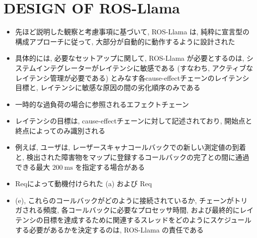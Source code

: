 
\section{DESIGN OF ROS-Llama}
\label{sec: design of ros-llama}

\begin{frame}{}
    \begin{itemize}
        \item 先ほど説明した観察と考慮事項に基づいて, ROS-Llama は, 純粋に宣言型の構成アプローチに従って, 大部分が自動的に動作するように設計された
        \item 具体的には, 必要なセットアップに関して, ROS-Llama が必要とするのは, システムインテグレーターがレイテンシに敏感である (すなわち, アクティブなレイテンシ管理が必要である) とみなす各cause-effectチェーンのレイテンシ目標と, レイテンシに敏感な原因の間の劣化順序のみである
        \item 一時的な過負荷の場合に参照されるエフェクトチェーン
    \end{itemize}
\end{frame}

\begin{frame}{}
    \begin{itemize}
        \item レイテンシの目標は, cause-effectチェーンに対して記述されており, 開始点と終点によってのみ識別される
        \item 例えば, ユーザは, レーザースキャナコールバックでの新しい測定値の到着と, 検出された障害物をマップに登録するコールバックの完了との間に通過できる最大 $200 \mathrm{~ms}$ を指定する場合がある
        \item Reqによって動機付けられた (a) および Req
        \item (e), これらのコールバックがどのように接続されているか, チェーンがトリガされる頻度, 各コールバックに必要なプロセッサ時間, および最終的にレイテンシの目標を達成するために関連するスレッドをどのようにスケジュールする必要があるかを決定するのは, ROS-Llama の責任である
    \end{itemize}
\end{frame}

